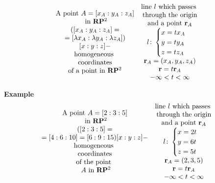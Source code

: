 \documentclass[12pt]{article}
\numberwithin{equation}{section}
\begin{document}
            
   \begin{equation*}
     \begin{matrix}
\hbox {A point $A=[x_A:y_A:z_A]$}\cr
\hbox { in ${\bf R}{\bf P}^2$}\cr
  ([x_A:y_A:z_A]=\cr
  =[\lambda x_A:\lambda y_A:\lambda z_A])\cr
          [x:y:z]-\cr
     \hbox{homogeneous }\cr
     \hbox {coordinates}\cr
    \hbox{of a point in ${\bf R}{\bf P}^2$}\cr
     \end{matrix}\quad
            \begin{matrix}
  \hbox {line $l$ which passes }\cr
    \hbox {through the origin}\cr
    \hbox {and a point ${\bf r}_A$}\cr
          l\colon \begin{cases}
                 x=tx_A\cr
                  y=ty_A\cr
                  z=tz_A\cr
                  \end{cases}
                          \cr
           {\bf r}_A=(x_A,y_A,z_A)\cr
               {\bf r}=t{\bf r}_A\cr
            -\infty<t<\infty\cr
             \end{matrix}
   \end{equation*}

\smallskip


{\bf Example}
       \begin{equation*}
     \begin{matrix}
\hbox {A point $A=[2:3:5]$}\cr
\hbox { in ${\bf R}{\bf P}^2$}\cr
  ([2:3:5]=\cr
  =[4:6:10]=[6:9:15)
          [x:y:z]-\cr
     \hbox{homogeneous }\cr
     \hbox {coordinates}\cr
    \hbox{of the point }\cr
    \hbox{ $A$ in ${\bf R}{\bf P}^2$}\cr
     \end{matrix}\quad
            \begin{matrix}
  \hbox {line $l$ which passes }\cr
    \hbox {through the origin}\cr
    \hbox {and a point ${\bf r}_A$}\cr
          l\colon \begin{cases}
                 x=2t\cr
                  y=6t\cr
                  z=5t\cr
                  \end{cases}
                          \cr
           {\bf r}_A=(2,3,5)\cr
               {\bf r}=t{\bf r}_A\cr
            -\infty<t<\infty\cr
             \end{matrix}
   \end{equation*}
\end{document}
